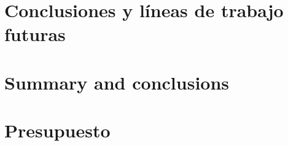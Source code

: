 \documentclass[spanish,a4paper,14pt,oneside]{extreport}
\begin{document}


\newpage{\pagestyle{empty}}
\thispagestyle{empty}

\chapter{Conclusiones y líneas de trabajo futuras}
\label{chapter:Conclusiones}



\newpage{\pagestyle{empty}}
\thispagestyle{empty}

\chapter{Summary and conclusions}
\label{chapter:ingles}



\newpage{\pagestyle{empty}}
\thispagestyle{empty}

\chapter{Presupuesto}
\label{chapter:Presupuesto}








\end{document}
